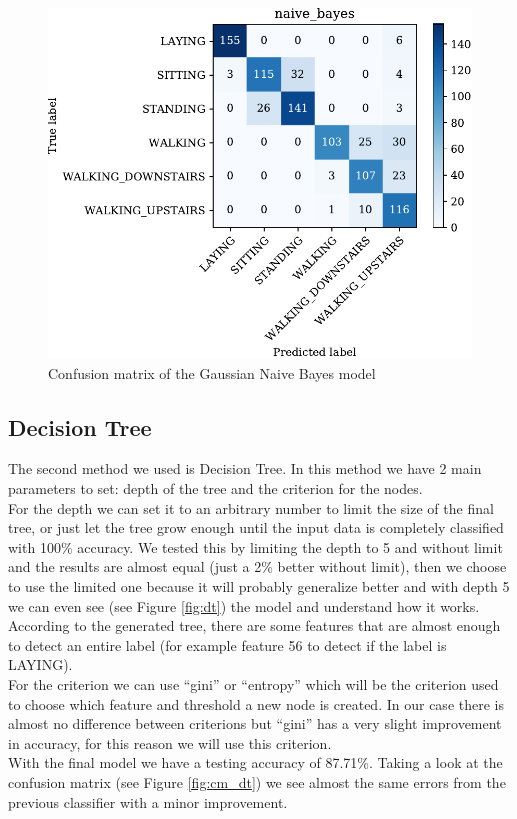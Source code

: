 \documentclass[conference,a4paper]{IEEEtran}
\begin{document}
\begin{figure}[htbp]
    \centering
    \includegraphics[width=0.8\columnwidth]{../plots/cm_naive_bayes.pdf}
    \caption{Confusion matrix of the Gaussian Naive Bayes model}
    \label{fig:cm_nb}
\end{figure}

\subsection{Decision Tree}
The second method we used is Decision Tree. In this method we have 2 main parameters to set: depth of the tree and the criterion for the nodes. \\
For the depth we can set it to an arbitrary number to limit the size of the final tree, or just let the tree grow enough until the input data is completely classified with 100\% accuracy. We tested this by limiting the depth to 5 and without limit and the results are almost equal (just a 2\% better without limit), then we choose to use the limited one because it will probably generalize better and with depth 5 we can even see (see Figure \ref{fig:dt}) the model and understand how it works. According to the generated tree, there are some features that are almost enough to detect an entire label (for example feature 56 to detect if the label is LAYING). \\
For the criterion we can use ``gini'' or ``entropy'' which will be the criterion used to choose which feature and threshold a new node is created. In our case there is almost no difference between criterions but ``gini'' has a very slight improvement in accuracy, for this reason we will use this criterion. \\
With the final model we have a testing accuracy of 87.71\%. Taking a look at the confusion matrix (see Figure \ref{fig:cm_dt}) we see almost the same errors from the previous classifier with a minor improvement.
\end{document}
